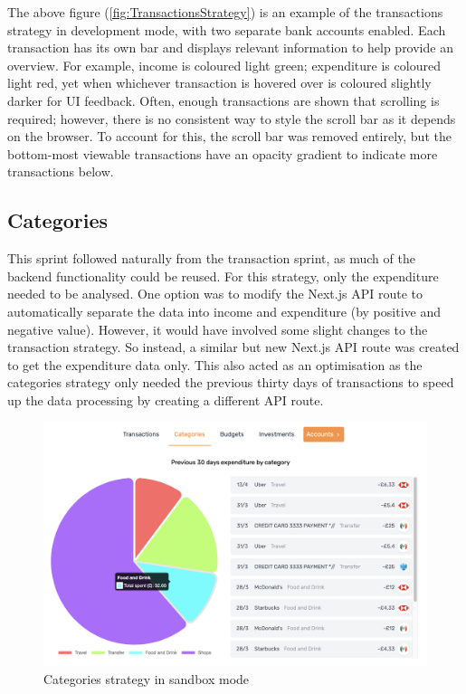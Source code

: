 The above figure (\ref{fig:TransactionsStrategy}) is an example of the transactions strategy in development mode, with two separate bank accounts enabled. Each transaction has its own bar and displays relevant information to help provide an overview. For example, income is coloured light green; expenditure is coloured light red, yet when whichever transaction is hovered over is coloured slightly darker for UI feedback. Often, enough transactions are shown that scrolling is required; however, there is no consistent way to style the scroll bar as it depends on the browser. To account for this, the scroll bar was removed entirely, but the bottom-most viewable transactions have an opacity gradient to indicate more transactions below.

\subsection{Categories}
This sprint followed naturally from the transaction sprint, as much of the backend functionality could be reused. For this strategy, only the expenditure needed to be analysed. One option was to modify the Next.js API route to automatically separate the data into income and expenditure (by positive and negative value). However, it would have involved some slight changes to the transaction strategy. So instead, a similar but new Next.js API route was created to get the expenditure data only. This also acted as an optimisation as the categories strategy only needed the previous thirty days of transactions to speed up the data processing by creating a different API route.

\begin{figure}[H]
	\centering
	\includegraphics[width=\textwidth]{images/Categories_sandbox.png}
	\caption{Categories strategy in sandbox mode}
	\label{fig:CategoriesStrategySandbox}
\end{figure}

